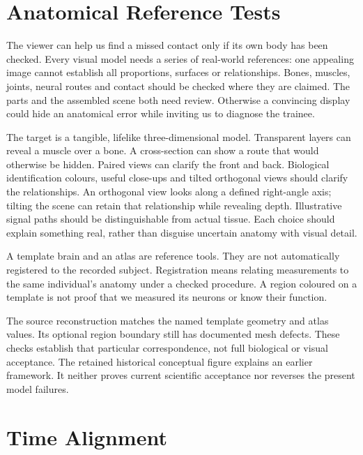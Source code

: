 \section{Anatomical Reference Tests}

The viewer can help us find a missed contact only if its own body has been checked. Every visual model needs a series of real-world references: one appealing image cannot establish all proportions, surfaces or relationships. Bones, muscles, joints, neural routes and contact should be checked where they are claimed. The parts and the assembled scene both need review. Otherwise a convincing display could hide an anatomical error while inviting us to diagnose the trainee.\par

The target is a tangible, lifelike three-dimensional model. Transparent layers can reveal a muscle over a bone. A cross-section can show a route that would otherwise be hidden. Paired views can clarify the front and back. Biological identification colours, useful close-ups and tilted orthogonal views should clarify the relationships. An orthogonal view looks along a defined right-angle axis; tilting the scene can retain that relationship while revealing depth. Illustrative signal paths should be distinguishable from actual tissue. Each choice should explain something real, rather than disguise uncertain anatomy with visual detail.\par

A template brain and an atlas are reference tools. They are not automatically registered to the recorded subject. Registration means relating measurements to the same individual's anatomy under a checked procedure. A region coloured on a template is not proof that we measured its neurons or know their function.\par

The source reconstruction matches the named template geometry and atlas values. Its optional region boundary still has documented mesh defects. These checks establish that particular correspondence, not full biological or visual acceptance. The retained historical conceptual figure explains an earlier framework. It neither proves current scientific acceptance nor reverses the present model failures.\par

\section{Time Alignment}

